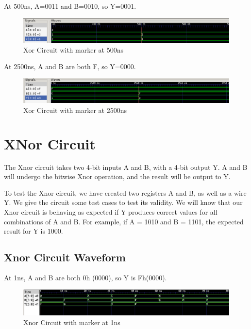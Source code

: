 \documentclass[12pt]{article}
\begin{document}
At 500ns, A=0011 and B=0010, so Y=0001.
 \begin{figure}[H]
 \centering 
\includegraphics[width = 1.0\textwidth]{Xor/xor_wave1.png}
 \caption{Xor Circuit with marker at 500ns}
 \label{fig:enter-label}
 \end{figure}

At 2500ns, A and B are both F, so Y=0000.
 \begin{figure}[H]
 \centering 
\includegraphics[width = 1.0\textwidth]{Xor/xor_wave2.png}
 \caption{Xor Circuit with marker at 2500ns}
 \label{fig:enter-label}
 \end{figure}

 \section{XNor Circuit}
 The Xnor circuit takes two 4-bit inputs A and B, with a 4-bit output Y. A and B will undergo the bitwise Xnor operation, and the result will be output to Y.
  
 
 To test the Xnor circuit, we have created two registers A and B, as well as a wire Y. We give the circuit some test cases to test its validity. We will know that our Xnor circuit is behaving as expected if Y produces correct values for all combinations of A and B. For example, if A = 1010 and B = 1101, the expected result for Y is 1000.
 
 
 \subsection{Xnor Circuit Waveform} 
 
 At 1ns, A and B are both 0h (0000), so Y is Fh(0000).
 \begin{figure}[H]
  \centering
  \includegraphics[width = 1.0\textwidth]{Xnor/XNOR-0ns.png}
  \caption{Xnor Circuit with marker at 1ns}
  \label{fig:enter-label} 
 \end{figure} 
 
\end{document}
